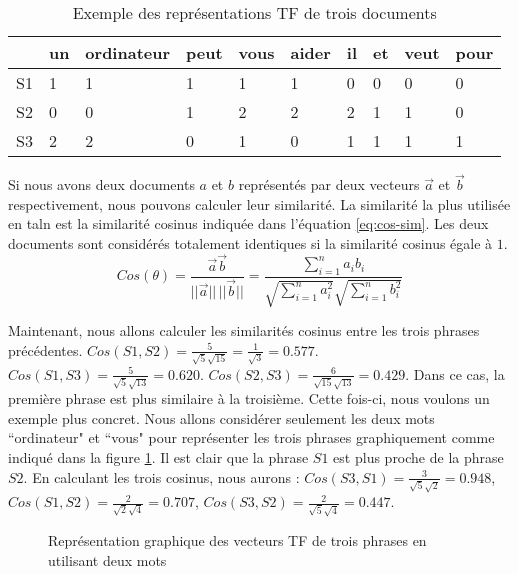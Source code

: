\documentclass{KodeBook}
\begin{document}
 \begin{table}[ht]
 	\centering
 	\begin{tabular}{llllllllll}
 		\hline\hline
 		& un & ordinateur & peut & vous & aider & il & et & veut & pour \\
 		\hline
 		S1 & 1 & 1 & 1 & 1 & 1 & 0 & 0 & 0 & 0\\
 		S2 & 0 & 0 & 1 & 2 & 2 & 2 & 1 & 1 & 0\\
 		S3 & 2 & 2 & 0 & 1 & 0 & 1 & 1 & 1 & 1\\
 		\hline\hline
 	\end{tabular}
 \caption{Exemple des représentations TF de trois documents}
 \label{tab:tf-exp}
 \end{table}

Si nous avons deux documents $a$ et $b$ représentés par deux vecteurs $\overrightarrow{a}$ et $\overrightarrow{b}$ respectivement, nous pouvons calculer leur similarité. 
La similarité la plus utilisée en \ac{taln} est la similarité cosinus indiquée dans l'équation \ref{eq:cos-sim}.
Les deux documents sont considérés totalement identiques si la similarité cosinus égale à $1$.
\begin{equation}
Cos(\theta) = \frac{\overrightarrow{a} \overrightarrow{b}}{||\overrightarrow{a}||\, ||\overrightarrow{b}||}
= \frac{\sum_{i=1}^{n} a_i b_i}{\sqrt{\sum_{i=1}^{n} a_i^2} \sqrt{\sum_{i=1}^{n} b_i^2}}
\label{eq:cos-sim}
\end{equation}


Maintenant, nous allons calculer les similarités cosinus entre les trois phrases précédentes. 
$Cos(S1, S2) = \frac{5}{\sqrt{5} \sqrt{15}} = \frac{1}{\sqrt{3}} = 0.577$. 
$Cos(S1, S3) = \frac{5}{\sqrt{5} \sqrt{13}} = 0.620$.
$Cos(S2, S3) = \frac{6}{\sqrt{15} \sqrt{13}} = 0.429$.
Dans ce cas, la première phrase est plus similaire à la troisième. 
Cette fois-ci, nous voulons un exemple plus concret.
Nous allons considérer seulement les deux mots ``ordinateur" et ``vous" pour représenter les trois phrases graphiquement comme indiqué dans la figure \ref{fig:tf-repr-graph-exp}.
Il est clair que la phrase $S1$ est plus proche de la phrase $S2$.
En calculant les trois cosinus, nous aurons :
$Cos(S3, S1) = \frac{3}{\sqrt{5} \sqrt{2}} = 0.948$, 
$Cos(S1, S2) = \frac{2}{\sqrt{2} \sqrt{4}} = 0.707$,
$Cos(S3, S2) = \frac{2}{\sqrt{5} \sqrt{4}} = 0.447$.
\begin{figure}[ht]
	\centering
{}
\caption{Représentation graphique des vecteurs TF de trois phrases en utilisant deux mots}
\label{fig:tf-repr-graph-exp}
\end{figure}
\end{document}
